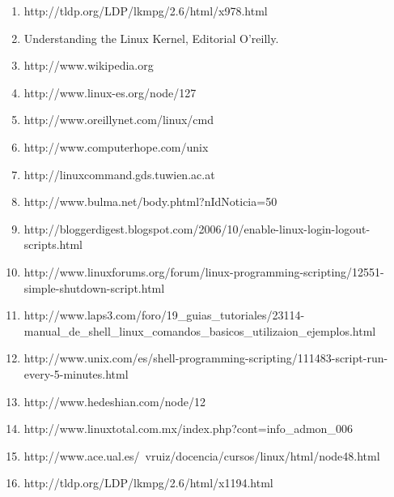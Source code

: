 \documentclass[a4paper, 12pt]{article}
\begin{document}
\begin{enumerate}
\item http://tldp.org/LDP/lkmpg/2.6/html/x978.html
\item Understanding the Linux Kernel, Editorial O'reilly.
\item http://www.wikipedia.org
\item http://www.linux-es.org/node/127 
\item http://www.oreillynet.com/linux/cmd 
\item http://www.computerhope.com/unix 
\item http://linuxcommand.gds.tuwien.ac.at 
\item http://www.bulma.net/body.phtml?nIdNoticia=50 
\item http://bloggerdigest.blogspot.com/2006/10/enable-linux-login-logout-scripts.html 
\item http://www.linuxforums.org/forum/linux-programming-scripting/12551-simple-shutdown-script.html 
\item http://www.laps3.com/foro/19\_guias\_tutoriales/23114-manual\_de\_shell\_linux\_comandos\_basicos\_utilizaion\_ejemplos.html
\item http://www.unix.com/es/shell-programming-scripting/111483-script-run-every-5-minutes.html
\item http://www.hedeshian.com/node/12 
\item http://www.linuxtotal.com.mx/index.php?cont=info\_admon\_006
\item http://www.ace.ual.es/~vruiz/docencia/cursos/linux/html/node48.html 
\item http://tldp.org/LDP/lkmpg/2.6/html/x1194.html
\end{enumerate}
\end{document}

